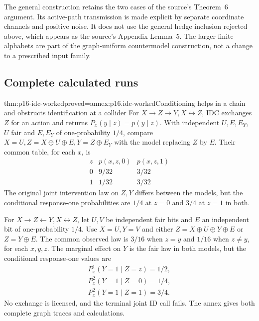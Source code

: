 The general construction retains the two cases of the source's Theorem~6
argument. Its active-path transmission is made explicit by separate
coordinate channels and positive noise. It does not use the general
hedge inclusion rejected above, which appears as the source's Appendix
Lemma~5. The larger finite alphabets are part of the graph-uniform
countermodel construction, not a change to a prescribed input family.

\subsection{Complete calculated runs}

\begin{hbtheorem}{thm:p16-idc-worked}{proved=annex:p16.idc-worked}{Conditioning helps in a chain and obstructs identification at a collider}
For \(X\to Z\to Y,X\leftrightarrow Z\), IDC exchanges
\(Z\) for an action and returns
\(P_x(y\mid z)=p(y\mid z)\). With independent
\(U,E,E_Y\), \(U\) fair and \(E,E_Y\) of one-probability
\(1/4\), compare \(X=U,Z=X\oplus U\oplus E,Y=Z\oplus E_Y\)
with the model replacing \(Z\) by \(E\). Their common table,
for each \(x\), is
\[
\begin{array}{c|cc}
z&p(x,z,0)&p(x,z,1)\\\hline
0&9/32&3/32\\
1&1/32&3/32
\end{array}
\]
The original joint intervention law on \(Z,Y\) differs between
the models, but the conditional response-one probabilities are
\(1/4\) at \(z=0\) and \(3/4\) at \(z=1\) in both.

For \(X\to Z\leftarrow Y,X\leftrightarrow Z\), let
\(U,V\) be independent fair bits and \(E\) an independent
bit of one-probability \(1/4\). Use \(X=U,Y=V\) and either
\(Z=X\oplus U\oplus Y\oplus E\) or \(Z=Y\oplus E\).
The common observed law is \(3/16\) when \(z=y\) and
\(1/16\) when \(z\ne y\), for each \(x,y,z\).
The marginal effect on \(Y\) is the fair law in both models,
but the conditional response-one values are
\[
\begin{gathered}
 P^1_x(Y=1\mid Z=z)=1/2,\\
 P^2_x(Y=1\mid Z=0)=1/4,\\
 P^2_x(Y=1\mid Z=1)=3/4.
\end{gathered}
\]
No exchange is licensed, and the terminal joint ID call fails.
The annex gives both complete graph traces and calculations.
\end{hbtheorem}

